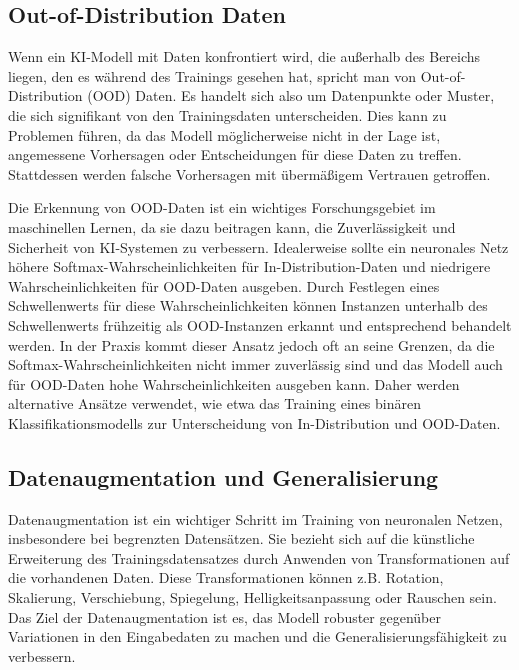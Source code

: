 \subsection{Out-of-Distribution Daten} \label{subsec-ood}

Wenn ein KI-Modell mit Daten konfrontiert wird, die außerhalb des Bereichs liegen, den es während des Trainings gesehen hat, spricht man von Out-of-Distribution (OOD) Daten. Es handelt sich also um Datenpunkte oder Muster, die sich signifikant von den Trainingsdaten unterscheiden. Dies kann zu Problemen führen, da das Modell möglicherweise nicht in der Lage ist, angemessene Vorhersagen oder Entscheidungen für diese Daten zu treffen. Stattdessen werden falsche Vorhersagen mit übermäßigem Vertrauen getroffen.

Die Erkennung von OOD-Daten ist ein wichtiges Forschungsgebiet im maschinellen Lernen, da sie dazu beitragen kann, die Zuverlässigkeit und Sicherheit von KI-Systemen zu verbessern. Idealerweise sollte ein neuronales Netz höhere Softmax-Wahrscheinlichkeiten für In-Distribution-Daten und niedrigere Wahrscheinlichkeiten für OOD-Daten ausgeben. Durch Festlegen eines Schwellenwerts für diese Wahrscheinlichkeiten können Instanzen unterhalb des Schwellenwerts frühzeitig als OOD-Instanzen erkannt und entsprechend behandelt werden. In der Praxis kommt dieser Ansatz jedoch oft an seine Grenzen, da die Softmax-Wahrscheinlichkeiten nicht immer zuverlässig sind und das Modell auch für OOD-Daten hohe Wahrscheinlichkeiten ausgeben kann. Daher werden alternative Ansätze verwendet, wie etwa das Training eines binären Klassifikationsmodells zur Unterscheidung von In-Distribution und OOD-Daten.

\subsection{Datenaugmentation und Generalisierung} \label{subsec-data-augmentation}

Datenaugmentation ist ein wichtiger Schritt im Training von neuronalen Netzen, insbesondere bei begrenzten Datensätzen. Sie bezieht sich auf die künstliche Erweiterung des Trainingsdatensatzes durch Anwenden von Transformationen auf die vorhandenen Daten. Diese Transformationen können z.B. Rotation, Skalierung, Verschiebung, Spiegelung, Helligkeitsanpassung oder Rauschen sein. Das Ziel der Datenaugmentation ist es, das Modell robuster gegenüber Variationen in den Eingabedaten zu machen und die Generalisierungsfähigkeit zu verbessern.


